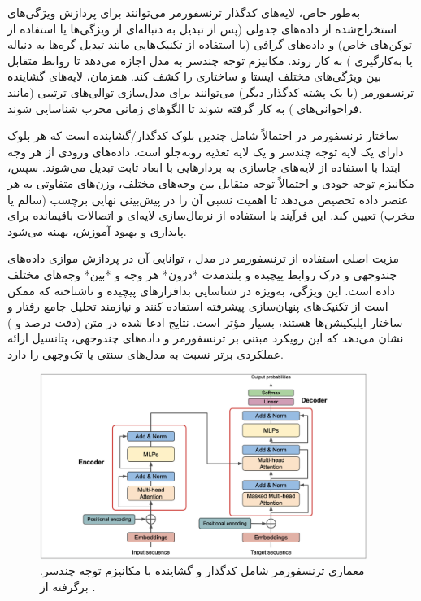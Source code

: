 به‌طور خاص، لایه‌های کدگذار ترنسفورمر می‌توانند برای پردازش ویژگی‌های استخراج‌شده از داده‌های جدولی (پس از تبدیل به دنباله‌ای از ویژگی‌ها یا استفاده از توکن‌های خاص) و داده‌های گرافی (با استفاده از تکنیک‌هایی مانند تبدیل گره‌ها به دنباله یا به‌کارگیری ) به کار روند. مکانیزم توجه چندسر به مدل اجازه می‌دهد تا روابط متقابل بین ویژگی‌های مختلف ایستا و ساختاری را کشف کند. همزمان، لایه‌های گشاینده ترنسفورمر (یا یک پشته کدگذار دیگر) می‌توانند برای مدل‌سازی توالی‌های ترتیبی (مانند فراخوانی‌های ) به کار گرفته شوند تا الگوهای زمانی مخرب شناسایی شوند.

ساختار ترنسفورمر در  احتمالاً شامل چندین بلوک کدگذار/گشاینده است که هر بلوک دارای یک لایه توجه چندسر و یک لایه تغذیه روبه‌جلو است. داده‌های ورودی از هر وجه ابتدا با استفاده از لایه‌های جاسازی به بردارهایی با ابعاد ثابت تبدیل می‌شوند. سپس، مکانیزم توجه خودی و احتمالاً توجه متقابل  بین وجه‌های مختلف، وزن‌های متفاوتی به هر عنصر داده تخصیص می‌دهد تا اهمیت نسبی آن را در پیش‌بینی نهایی برچسب (سالم یا مخرب) تعیین کند. این فرآیند با استفاده از نرمال‌سازی لایه‌ای و اتصالات باقیمانده برای پایداری و بهبود آموزش، بهینه می‌شود.

مزیت اصلی استفاده از ترنسفورمر در مدل ، توانایی آن در پردازش موازی داده‌های چندوجهی و درک روابط پیچیده و بلندمدت *درون* هر وجه و *بین* وجه‌های مختلف داده است. این ویژگی، به‌ویژه در شناسایی بدافزارهای پیچیده و ناشناخته که ممکن است از تکنیک‌های پنهان‌سازی پیشرفته استفاده کنند و نیازمند تحلیل جامع رفتار و ساختار اپلیکیشن‌ها هستند، بسیار مؤثر است. نتایج ادعا شده در متن (دقت  درصد و  ) نشان می‌دهد که این رویکرد مبتنی بر ترنسفورمر و داده‌های چندوجهی، پتانسیل ارائه عملکردی برتر نسبت به مدل‌های سنتی یا تک‌وجهی را دارد.

\begin{figure}[!t]
    \centering
    \includegraphics[width=0.95\textwidth]{images/transformer_structure}
    \caption{معماری ترنسفورمر شامل کدگذار و گشاینده با مکانیزم توجه چندسر. برگرفته از \cite{attention}.}
    \label{fig:transformer_structure}
\end{figure}

